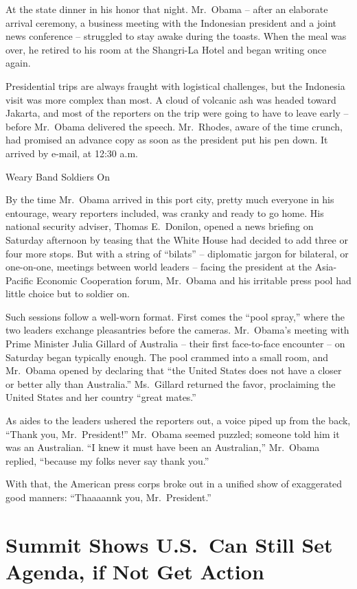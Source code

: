﻿\documentclass[12pt]{article}
\begin{document}
At the state dinner in his honor that night. Mr.~Obama -- after an elaborate arrival ceremony, a
business meeting with the Indonesian president and a joint news conference -- struggled to stay
awake during the toasts. When the meal was over, he retired to his room at the Shangri-La Hotel and
began writing once again.

Presidential trips are always fraught with logistical challenges, but the Indonesia visit was more
complex than most. A cloud of volcanic ash was headed toward Jakarta, and most of the reporters on
the trip were going to have to leave early -- before Mr.~Obama delivered the speech. Mr.~Rhodes,
aware of the time crunch, had promised an advance copy as soon as the president put his pen down. It
arrived by e-mail, at 12:30 a.m.

Weary Band Soldiers On

By the time Mr.~Obama arrived in this port city, pretty much everyone in his entourage, weary
reporters included, was cranky and ready to go home. His national security adviser, Thomas
E.~Donilon, opened a news briefing on Saturday afternoon by teasing that the White House had decided
to add three or four more stops. But with a string of ``bilats'' -- diplomatic jargon for bilateral,
or one-on-one, meetings between world leaders -- facing the president at the Asia-Pacific Economic
Cooperation forum, Mr.~Obama and his irritable press pool had little choice but to soldier on.

Such sessions follow a well-worn format. First comes the ``pool spray,'' where the two leaders
exchange pleasantries before the cameras. Mr.~Obama's meeting with Prime Minister Julia Gillard of
Australia -- their first face-to-face encounter -- on Saturday began typically enough. The pool
crammed into a small room, and Mr.~Obama opened by declaring that ``the United States does not have
a closer or better ally than Australia.'' Ms.~Gillard returned the favor, proclaiming the United
States and her country ``great mates.''

As aides to the leaders ushered the reporters out, a voice piped up from the back, ``Thank you,
Mr.~President!'' Mr.~Obama seemed puzzled; someone told him it was an Australian. ``I knew it must
have been an Australian,'' Mr.~Obama replied, ``because my folks never say thank you.''

With that, the American press corps broke out in a unified show of exaggerated good manners:
``Thaaaannk you, Mr.~President.''

\section{Summit Shows U.S.~Can Still Set Agenda, if Not Get Action}
\end{document}
